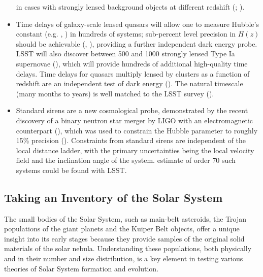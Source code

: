 \begin{itemize}
in cases with strongly lensed background objects at different redshift (\cite{2000ApJ...532..679P}; \cite{2003MNRAS.338L..25O}).
\item Time delays of galaxy-scale lensed quasars will allow one to measure Hubble's constant
(e.g. \cite{2010ApJ...711..201S}, \cite{2017MNRAS.465.4914B}) in hundreds of systems; sub-percent level precision in
$H(z)$ should be achievable (\cite{2009ApJ...706...45C}, \cite{2016A&ARv..24...11T}), providing a further independent dark energy probe.
LSST will also discover between 500 and 1000 strongly lensed Type Ia supernovae (\cite{2017ApJ...834L...5G,2017arXiv170800003G}), which will provide hundreds of additional high-quality time delays.
Time delays for quasars multiply lensed by clusters as a function of redshift are an independent test
of dark energy (\cite{1997ApJ...482...75K}). The natural timescale (many months to years) is well matched
to the LSST survey (\cite{2010MNRAS.405.2579O}).
\item Standard sirens are a new cosmological probe, demonstrated by the recent discovery of a binary
  neutron star merger by LIGO with an electromagnetic counterpart (\cite{2017ApJ...848L..12A}), which was
  used to constrain the Hubble parameter to roughly 15\% precision (\cite{2017arXiv171005835A}).
  Constraints from standard sirens are independent of the local distance ladder, with the primary
  uncertainties being the local velocity field and the inclination angle of the system.  \cite{2017arXiv171005845S}
  estimate of order 70 such systems could be found with LSST.
\end{itemize}


\subsection{Taking an Inventory of the Solar System}



The small bodies of the Solar System, such as main-belt asteroids,
the Trojan populations of the giant planets and the Kuiper Belt objects,
offer a unique insight into its early stages because they provide
samples of the original solid materials of the solar nebula.
Understanding these populations, both physically and in their number
and size distribution, is a key element in testing various theories of
Solar System formation and evolution.


